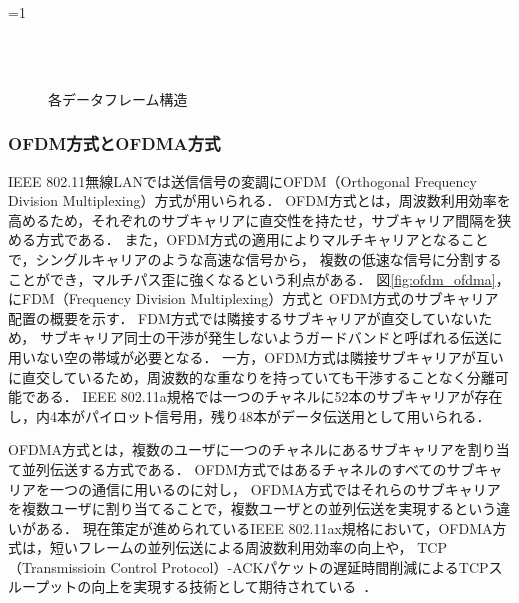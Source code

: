 \documentclass[master]{kuisthesis}		%
\newcounter{flagFig}
\begin{document}
			\ifnum\value{flagFig}=1 {\begin{figure}[htbp]
				\begin{center}
					\\
					\\
					\caption{各データフレーム構造}
					\label{fig:frame}
				\end{center}
			\end{figure}}\fi

		\subsubsection{OFDM方式とOFDMA方式}
			IEEE 802.11無線LANでは送信信号の変調にOFDM（Orthogonal Frequency Division Multiplexing）方式が用いられる．
			OFDM方式とは，周波数利用効率を高めるため，それぞれのサブキャリアに直交性を持たせ，サブキャリア間隔を狭める方式である．
			また，OFDM方式の適用によりマルチキャリアとなることで，シングルキャリアのような高速な信号から，
			複数の低速な信号に分割することができ，マルチパス歪に強くなるという利点がある．
			図\ref{fig:ofdm_ofdma}，にFDM（Frequency Division Multiplexing）方式と
			OFDM方式のサブキャリア配置の概要を示す．
			FDM方式では隣接するサブキャリアが直交していないため，
			サブキャリア同士の干渉が発生しないようガードバンドと呼ばれる伝送に用いない空の帯域が必要となる．
			一方，OFDM方式は隣接サブキャリアが互いに直交しているため，周波数的な重なりを持っていても干渉することなく分離可能である．
			IEEE 802.11a規格では一つのチャネルに52本のサブキャリアが存在し，内4本がパイロット信号用，残り48本がデータ伝送用として用いられる．
			\par
			OFDMA方式とは，複数のユーザに一つのチャネルにあるサブキャリアを割り当て並列伝送する方式である．
			OFDM方式ではあるチャネルのすべてのサブキャリアを一つの通信に用いるのに対し，
			OFDMA方式ではそれらのサブキャリアを複数ユーザに割り当てることで，複数ユーザとの並列伝送を実現するという違いがある．
			現在策定が進められているIEEE 802.11ax規格において，OFDMA方式は，短いフレームの並列伝送による周波数利用効率の向上や，
			TCP（Transmissioin Control Protocol）-ACKパケットの遅延時間削減によるTCPスループットの向上を実現する技術として期待されている~\cite{ofdma}．
\end{document}
